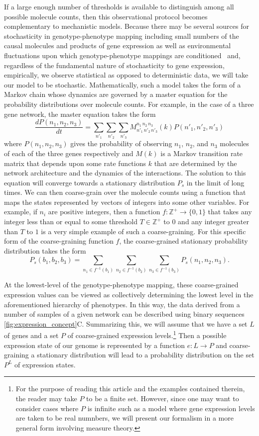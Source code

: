 If a large enough number of thresholds is available to distinguish among all possible molecule counts, then this observational protocol becomes complementary to mechanistic models.  Because there may be several sources for stochasticity in genotype-phenotype mapping including small numbers of the causal molecules and products of gene expression as well as environmental fluctuations upon which genotype-phenotype mappings are conditioned~\cite{Swain2002,Paulsson2004,Thattai2004,Acar2008a,Lestas2010,Munsky2012,Chalancon2012,Neuert2013,Sanchez2013} and, regardless of the fundamental nature of stochasticity to gene expression, empirically, we observe statistical as opposed to deterministic data, we will take our model to be stochastic.  Mathematically, such a model takes the form of a Markov chain whose dynamics are governed by a master equation for the probability distributions over molecule counts.   For example, in the case of a three gene network, the master equation takes the form
$$
\frac{dP(n_1,n_2,n_3)}{dt} = \sum_{n'_1}\sum_{n'_2}\sum_{n'_3} M^{n_1\,n_2\,n_3}_{n'_1\,n'_2\,n'_3}(k) P(n'_1,n'_2,n'_3)
$$
where $P(n_1,n_2,n_3)$ gives the probability of observing $n_1$, $n_2$, and $n_3$ molecules of each of the three genes respectively and $M(k)$ is a Markov transition rate matrix that depends upon some rate functions $k$ that are determined by the network architecture and the dynamics of the interactions.  The solution to this equation will converge towards  a stationary distribution $P_s$ in the limit of long times. We can then coarse-grain over the molecule counts using a function that maps the states represented by vectors of integers into some other variables. For example, if $n_i$ are positive integers, then a function $f \colon \mathbb{Z}^+ \rightarrow \{0,1\}$ that takes any integer less than or equal to some threshold $T \in \mathbb{Z}^+$ to $0$ and any integer greater than $T$ to $1$ is a very simple example of such a coarse-graining. For this specific form of the coarse-graining function $f$, the coarse-grained stationary probability distribution takes the form
$$
P_s(b_1,b_2,b_3) = \sum_{n_1 \in f^{-1}(b_1)}\sum_{n_2 \in f^{-1}(b_2)}\sum_{n_3 \in f^{-1}(b_3)} P_s(n_1,n_2,n_3).
$$

At the lowest-level of the genotype-phenotype mapping, these coarse-grained expression values can be viewed as collectively determining the lowest level in the aforementioned hierarchy of phenotypes. In this way, the data derived from a number of samples of a given network can be described using binary sequences \ref{fig:expression_concept}C.  Summarizing this, we will assume that we have a set $L$ of genes and a set $P$ of coarse-grained expression levels.\footnote{For the purpose of reading this article and the examples contained therein, the reader may take $P$ to be a finite set.  However, since one may want to consider cases where $P$ is infinite such as a model where gene expression levels are taken to be real numnbers, we will present our formalism in a more general form involving measure theory.}  Then a possible expression state of our genome is represented by a function $e : L \to P$ and coarse-graining a stationary distribution will lead to a probability distribution on the set $P^L$ of expression states.

